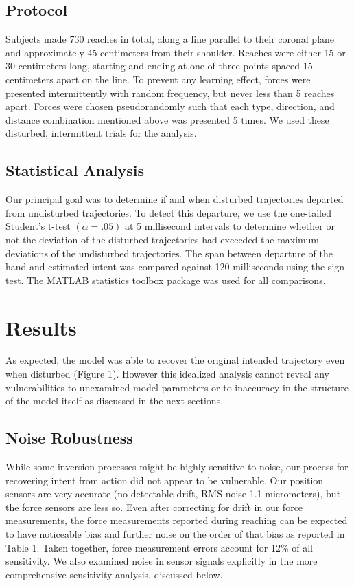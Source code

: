 \subsection*{Protocol}
Subjects made 730 reaches in total, along a line parallel to their coronal plane and approximately 45 centimeters from their shoulder. Reaches were either 15 or 30 centimeters long, starting and ending at one of three points spaced 15 centimeters apart on the line. To prevent any learning effect, forces were presented intermittently with random frequency, but never less than 5 reaches apart. Forces were chosen pseudorandomly such that each type, direction, and distance combination mentioned above was presented 5 times. We used these disturbed, intermittent trials for the analysis. 

\subsection*{Statistical Analysis}
Our principal goal was to determine if and when disturbed trajectories departed from undisturbed trajectories. To detect this departure, we use the one-tailed Student's t-test $(\alpha=.05)$ at 5 millisecond intervals to determine whether or not the deviation of the disturbed trajectories had exceeded the maximum deviations of the undisturbed trajectories. The span between departure of the hand and estimated intent was compared against 120 milliseconds using the sign test. The MATLAB statistics toolbox package \cite{MATLAB:2008} was used for all comparisons.

\section*{Results}
As expected, the model was able to recover the original intended trajectory even when disturbed (Figure 1). However this idealized analysis cannot reveal any vulnerabilities to unexamined model parameters or to inaccuracy in the structure of the model itself as discussed in the next sections.

\subsection*{Noise Robustness}
While some inversion processes might be highly sensitive to noise, our process for recovering intent from action did not appear to be vulnerable. Our position sensors are very accurate (no detectable drift, RMS noise 1.1 micrometers), but the force sensors are less so. Even after correcting for drift in our force measurements, the force measurements reported during reaching can be expected to have noticeable bias and further noise on the order of that bias as reported in Table 1. Taken together, force measurement errors account for 12\% of all sensitivity. We also examined noise in sensor signals explicitly in the more comprehensive sensitivity analysis, discussed below.

